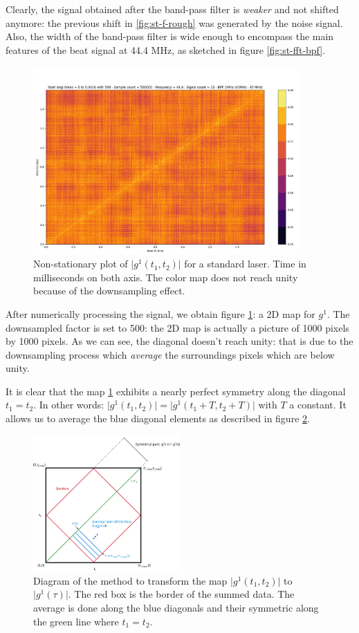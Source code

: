 \documentclass[11pt]{report}
\begin{document}
Clearly, the signal obtained after the band-pass filter is \textit{weaker} and not shifted anymore: the previous shift in \ref{fig:st-f-rough} was generated by the noise signal. Also, the width of the band-pass filter is wide enough to encompass the main features of the beat signal at 44.4 MHz, as sketched in figure \ref{fig:st-fft-bpf}.

\begin{figure}[h!]
\centering
\includegraphics[width=0.9\textwidth]{st-g12}
\caption{Non-stationary plot of $\vert g^1(t_1, t_2)\vert$ for a standard laser. Time in milliseconds on both axis. The color map does not reach unity because of the downsampling effect.}
\label{fig:st-g12}
\end{figure}
After numerically processing the signal, we obtain figure \ref{fig:st-g12}: a 2D map for $g^1$. The downsampled factor is set to 500: the 2D map is actually a picture of 1000 pixels by 1000 pixels. As we can see, the diagonal doesn't reach unity: that is due to the downsampling process which \textit{average} the surroundings pixels which are below unity.

It is clear that the map \ref{fig:st-g12} exhibits a nearly perfect symmetry along the diagonal $t_1=t_2$. In other words: $\vert g^1(t_1, t_2) \vert = \vert g^1(t_1 + T, t_2 + T) \vert$ with $T$ a constant. It allows us to average the blue diagonal elements as described in figure \ref{fig:to-st}.

\begin{figure}[h!]
\centering
\includegraphics[width=0.5\textwidth]{to-st}
\caption{Diagram of the method to transform the map $\vert g^1(t_1, t_2) \vert$ to $\vert g^1(\tau) \vert$. The red box is the border of the summed data. The average is done along the blue diagonals and their symmetric along the green line where $t_1=t_2$.}
\label{fig:to-st}
\end{figure}
\end{document}
